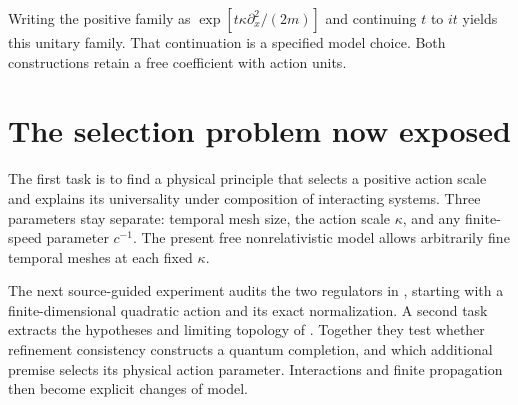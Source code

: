 \documentclass[11pt,a4paper]{article}
\begin{document}
Writing the positive family as $\exp[t\kappa\partial_x^2/(2m)]$ and continuing
$t$ to $it$ yields this unitary family. That continuation is a specified model
choice. Both constructions retain a free coefficient with action units.

\section{The selection problem now exposed}
The first task is to find a physical principle that selects a positive action
scale and explains its universality under composition of interacting systems.
Three parameters stay separate: temporal mesh size, the action scale $\kappa$,
and any finite-speed parameter $c^{-1}$. The present free nonrelativistic model
allows arbitrarily fine temporal meshes at each fixed $\kappa$.

The next source-guided experiment audits the two regulators in
\cite{RiveroFeynman1998}, starting with a finite-dimensional quadratic action
and its exact normalization. A second task extracts the hypotheses and limiting
topology of \cite{CarinenaEtAl1999}. Together they test whether refinement
consistency constructs a quantum completion, and which additional premise
selects its physical action parameter. Interactions and finite propagation
then become explicit changes of model.

\clearpage


\end{document}
